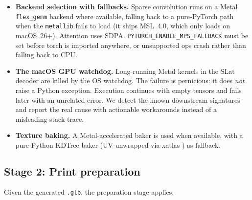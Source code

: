 \documentclass[11pt,a4paper]{article}
\begin{document}
\begin{itemize}[leftmargin=*]
  \item \textbf{Backend selection with fallbacks.} Sparse convolution runs on
        a Metal \texttt{flex\_gemm} backend where available, falling back to a
        pure-PyTorch path when the \texttt{metallib} fails to load (it ships
        MSL~4.0, which only loads on macOS~26+). Attention uses SDPA.
        \texttt{PYTORCH\_ENABLE\_MPS\_FALLBACK} must be set before torch is
        imported anywhere, or unsupported ops crash rather than falling back
        to CPU.
  \item \textbf{The macOS GPU watchdog.} Long-running Metal kernels in the
        SLat decoder are killed by the OS watchdog. The failure is
        pernicious: it does \emph{not} raise a Python exception. Execution
        continues with empty tensors and fails later with an unrelated error.
        We detect the known downstream signatures and report the real cause
        with actionable workarounds instead of a misleading stack trace.
  \item \textbf{Texture baking.} A Metal-accelerated baker is used when
        available, with a pure-Python KDTree baker (UV-unwrapped via xatlas
        \cite{xatlas}) as fallback.
\end{itemize}

\subsection{Stage 2: Print preparation}
\label{sec:prep}

Given the generated \texttt{.glb}, the preparation stage applies:
\end{document}

